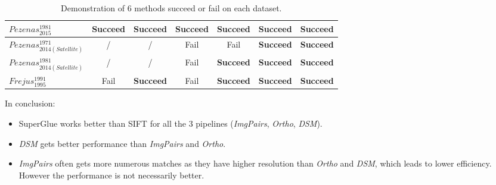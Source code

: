 \begin{table}[htbp]
\begin{tabular}{||l|c|c|c|c|c|c||}
$Pezenas_{2015}^{1981}$ &  \textbf{Succeed}  &  \textbf{Succeed}  &  \textbf{Succeed}  &  \textbf{Succeed}  &  \textbf{Succeed}  &  \textbf{Succeed} \\\hline
$Pezenas_{2014(Satellite)}^{1971}$ & / & / &  Fail  &  Fail  &  \textbf{Succeed}  &  \textbf{Succeed} \\
$Pezenas_{2014(Satellite)}^{1981}$ & / & / &  Fail  &  \textbf{Succeed}  &  \textbf{Succeed}  &  \textbf{Succeed} \\\hline
$Frejus_{1995}^{1991}$ &  Fail  &  \textbf{Succeed}  &  Fail  &  \textbf{Succeed}  &  \textbf{Succeed}  &  \textbf{Succeed} \\\hline
	\end{tabular}
	\caption{Demonstration of 6 methods succeed or fail on each dataset.}
	\label{succeedorfail}
\end{table}

In conclusion:\\
\begin{itemize}
	\item SuperGlue works better than SIFT for all the 3 pipelines (\textit{ImgPairs}, \textit{Ortho}, \textit{DSM}). 
	\item \textit{DSM} gets better performance than \textit{ImgPairs} and \textit{Ortho}.
	\item \textit{ImgPairs} often gets more numerous matches as they have higher resolution than \textit{Ortho} and \textit{DSM}, which leads to lower efficiency. However the performance is not necessarily better.
\end{itemize}


